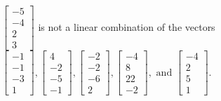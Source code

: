 \begin{exerciseAnswer}
\begin{enumerate}[(a)]
\( \left[\begin{array}{c}
-5 \\
-4 \\
2 \\
3
\end{array}\right] \) is not a linear combination of the vectors \( \left[\begin{array}{c}
-1 \\
-1 \\
-3 \\
1
\end{array}\right] , \left[\begin{array}{c}
4 \\
-2 \\
-5 \\
-1
\end{array}\right] , \left[\begin{array}{c}
-2 \\
-2 \\
-6 \\
2
\end{array}\right] , \left[\begin{array}{c}
-4 \\
8 \\
22 \\
-2
\end{array}\right] , \text{ and } \left[\begin{array}{c}
-4 \\
2 \\
5 \\
1
\end{array}\right] \). 


\end{enumerate}
    
\end{exerciseAnswer}
    
